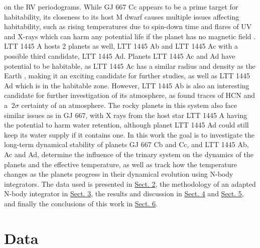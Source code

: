 \documentclass[referee]{aa}
\begin{document}
    on the RV periodograms. While GJ 667 Cc appears to be a prime target for habitability, its closeness to its host M dwarf causes multiple issues affecting habitability, such as
    rising temperatures due to spin-down time \citep{MarakovGJ667C} and flares of UV and X-rays which can harm any potential life if the planet has no magnetic field \citep{SloaneGJ667cXray}.
    LTT 1445 A hosts 2 planets as well, LTT 1445 Ab and LTT 1445 Ac with a possible third candidate, LTT 1445 Ad. \citep[][]{Winters_2019, Winters_2022}
    Planets LTT 1445 Ac and Ad have potential to be habitable, as LTT 1445 Ac has a similar radius and density as the Earth \citep{Pass_2023}, making it an exciting candidate for further studies,
    as well as LTT 1445 Ad which is in the habitable zone. However, LTT 1445 Ab is also an interesting candidate for further investigation of its atmosphere, as \citep{Bennett_2025} found traces of HCN and a $~2\sigma$ certainty
    of an atmosphere. The rocky planets in this system also face similar issues as in GJ 667, with X rays from the host star LTT 1445 A having the potential to harm
    water retention, although planet LTT 1445 Ad could still keep its water supply if it contains one. %
    In this work the goal is to investigate the long-term dynamical stability of planets GJ 667 Cb and Cc, and LTT 1445 Ab, Ac and Ad, determine the influence of the trinary system on the dynamics of the planets
    and the effective temperature, as well as track how the temperature changes as the planets progress in their dynamical evolution using N-body integrators. The data used is presented in
    \hyperref[sec:data]{Sect. 2}, the methodology of an adapted N-body integrator in \hyperref[sec:method]{Sect. 3}, the results and discussion in \hyperref[sec:result]{Sect. 4} and \hyperref[sec:discuss]{Sect. 5},
    and finally the conclusions of this work in \hyperref[sec:conclusion]{Sect. 6}.

    \section{Data}\label{sec:data}
\end{document}
